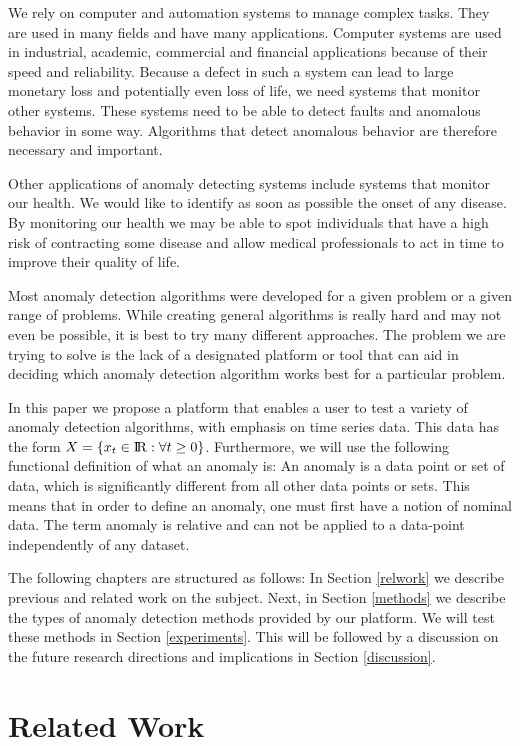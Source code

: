\documentclass{article}
\begin{document}
We rely on computer and automation systems to manage complex tasks. They are used in many fields and have many applications. Computer systems are used in industrial, academic, commercial and financial applications because of their speed and reliability. Because a defect in such a system can lead to large monetary loss and potentially even loss of life, we need systems that monitor other systems. These systems need to be able to detect faults and anomalous behavior in some way. Algorithms that detect anomalous behavior are therefore necessary and important.

Other applications of anomaly detecting systems include systems that monitor our health. We would like to identify as soon as possible the onset of any disease. By monitoring our health we may be able to spot individuals that have a high risk of contracting some disease and allow medical professionals to act in time to improve their quality of life.

Most anomaly detection algorithms were developed for a given problem or a given range of problems. While creating general algorithms is really hard and may not even be possible, it is best to try many different approaches. The problem we are trying to solve is the lack of a designated platform or tool that can aid in deciding which anomaly detection algorithm works best for a particular problem.

In this paper we propose a platform that enables a user to test a variety of anomaly detection algorithms, with emphasis on time series data. This data has the form $X = \{x_t \in {\rm I\!R} : \forall t \ge 0\}$. Furthermore, we will use the following functional definition of what an anomaly is: An anomaly is a data point or set of data, which is significantly different from all other data points or sets. This means that in order to define an anomaly, one must first have a notion of nominal data. The term anomaly is relative and can not be applied to a data-point independently of any dataset.

The following chapters are structured as follows: In Section \ref{relwork} we describe previous and related work on the subject. Next, in Section \ref{methods} we describe the types of anomaly detection methods provided by our platform. We will test these methods in Section \ref{experiments}. This will be followed by a discussion on the future research directions and implications in Section \ref{discussion}.

\section{Related Work \label{relwork}}
\end{document}
